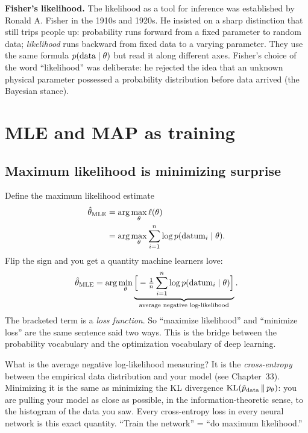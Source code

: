 \begin{marginnotebox}
\textbf{Fisher's likelihood.}
The likelihood as a tool for inference was established by Ronald A.
Fisher in the 1910s and 1920s. He insisted on a sharp distinction that still
trips people up: probability runs forward from a fixed parameter to random data;
\emph{likelihood} runs backward from fixed data to a varying parameter. They use
the same formula $p(\text{data}\mid\theta)$ but read it along different axes.
Fisher's choice of the word ``likelihood'' was deliberate: he rejected the idea
that an unknown physical parameter possessed a probability distribution before data
arrived (the Bayesian stance).
\end{marginnotebox}

\section{MLE and MAP as training}
\label{ch34:mle-map}

\subsection{Maximum likelihood is minimizing surprise}

Define the maximum likelihood estimate
\begin{align*}
  \hat\theta_{\text{MLE}} &= \arg\max_\theta \ell(\theta) \\
                          &= \arg\max_\theta \sum_{i=1}^n \log p(\text{datum}_i\mid\theta).
\end{align*}
Flip the sign and you get a quantity machine learners love:
\[
  \hat\theta_{\text{MLE}} = \arg\min_\theta \underbrace{\Big[-\tfrac{1}{n}\sum_{i=1}^n \log p(\text{datum}_i\mid\theta)\Big]}_{\text{average negative log-likelihood}}.
\]
The bracketed term is a \emph{loss function}. So ``maximize likelihood'' and
``minimize loss'' are the same sentence said two ways. This is the bridge between
the probability vocabulary and the optimization vocabulary of deep learning.

\begin{happeningbox}
What is the average negative log-likelihood measuring? It is the
\emph{cross-entropy} between the empirical data distribution and your model (see
Chapter~33). Minimizing it is the same as minimizing the KL
divergence $\operatorname{KL}(\hat p_{\text{data}} \,\|\, p_\theta)$: you are pulling your
model as close as possible, in the information-theoretic sense, to the histogram
of the data you saw. Every cross-entropy loss in every neural network is this
exact quantity. ``Train the network'' = ``do maximum likelihood.''
\end{happeningbox}

